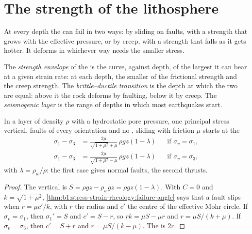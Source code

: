 \section{The strength of the lithosphere}\label{sec:b1:stress-strain-rheology:envelope}

At every depth the  can fail in two ways: by sliding on faults,
with a strength that grows with the effective pressure, or by creep, with a
strength that falls as it gets hotter. It deforms in whichever way needs the
smaller stress.

\begin{definition}\label{def:b1:stress-strain-rheology:strength-envelope}
The \emph{strength envelope} of the  is
the curve, against depth, of the largest  it can bear at a
given strain rate: at each depth, the smaller of the frictional strength and
the creep strength. The \emph{brittle--ductile transition} is the depth at which the two are equal: above it the rock
deforms by faulting, below it by creep. The \emph{seismogenic
layer} is the range of depths in which most
earthquakes start.
\end{definition}

\begin{proposition}\label{prop:b1:stress-strain-rheology:brittle-gradient}
In a layer of density $\rho$ with a hydrostatic pore pressure, one principal
stress vertical, faults of every orientation and no , sliding with
friction $\mu$ starts at the 
\begin{align*}
  \sigma_1 - \sigma_3 &= \frac{2\mu}{\sqrt{1+\mu^2} + \mu}\,\rho g z(1-\lambda)
  && \text{if $\sigma_v = \sigma_1$}, \\
  \sigma_1 - \sigma_3 &= \frac{2\mu}{\sqrt{1+\mu^2} - \mu}\,\rho g z(1-\lambda)
  && \text{if $\sigma_v = \sigma_3$},
\end{align*}
with $\lambda = \rho_w/\rho$: the first case gives normal faults, the second
thrusts.
\end{proposition}

\begin{proof}
The vertical  is $S = \rho g z - \rho_w g z = \rho g z(1-\lambda)$.
With $C = 0$ and $k = \sqrt{1+\mu^2}$, \cref{thm:b1:stress-strain-rheology:failure-angle}
says that a fault slips when $r = \mu c'/k$, with $r$ the radius and $c'$ the
centre of the effective Mohr circle. If $\sigma_v = \sigma_1$, then
$\sigma_1' = S$ and $c' = S - r$, so $rk = \mu S - \mu r$ and
$r = \mu S/(k+\mu)$. If $\sigma_v = \sigma_3$, then $c' = S + r$ and
$r = \mu S/(k-\mu)$. The  is $2r$.
\end{proof}

